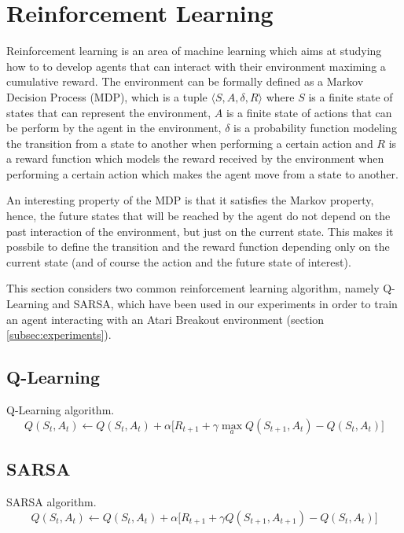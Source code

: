 \section{Reinforcement Learning}
Reinforcement learning \cite{Suttonrl18} is an area of machine learning
which aims at studying how to to develop agents that can interact with
their environment maximing a cumulative reward. The environment can be
formally defined as a Markov Decision Process (MDP), which is a tuple
$\langle S, A, \delta, R \rangle$ where $S$ is a finite state of states that can represent
the environment, $A$ is a finite state of actions that can be perform by
the agent in the environment, $\delta$ is a probability function modeling
the transition from a state to another when performing a certain action and
$R$ is a reward function which models the reward received by the environment
when performing a certain action which makes the agent move from a state
to another.

An interesting property of the MDP is that it satisfies the Markov property,
hence, the future states that will be reached by the agent do not depend
on the past interaction of the environment, but just on the current state.
This makes it possbile to define the transition and the reward function
depending only on the current state (and of course the action and the future
state of interest).

This section considers two common reinforcement learning algorithm,
namely Q-Learning and SARSA, which have been used in our experiments
in order to train an agent interacting with an Atari Breakout environment
(section \ref{subsec:experiments}).

\subsection{Q-Learning}
Q-Learning algorithm.
\begin{equation}
    Q(S_t, A_t) \leftarrow Q(S_t, A_t) + \alpha \Big[ R_{t+1} +
        \gamma \max_{a} Q(S_{t+1}, A_t) - Q(S_t, A_t) \Big]
\end{equation}



\subsection{SARSA}
SARSA algorithm.
\begin{equation}
    Q(S_t, A_t) \leftarrow Q(S_t, A_t) + \alpha \Big[ R_{t+1} +
        \gamma Q(S_{t+1}, A_{t+1}) - Q(S_t, A_t) \Big]
\end{equation}


